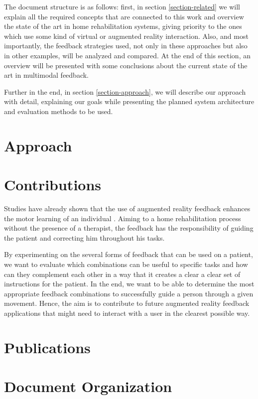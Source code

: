 
The document structure is as follows: first, in section \ref{section-related} we will 
explain all the required concepts that are connected to 
this work and overview the state of the art in home rehabilitation systems, giving priority to 
the ones which use some kind of virtual or augmented reality interaction. Also, and most importantly, the feedback strategies used,
not only in these approaches but also in other examples, will be analyzed and compared. 
At the end of this section, an overview will be presented with some conclusions about the current state of the art in multimodal feedback.

Further in the end, in section \ref{section-approach}, we will describe our approach with detail, explaining our goals 
while presenting the planned system architecture and evaluation methods to be used.


\section{Approach}

\section{Contributions}


Studies have already shown that the use of augmented reality feedback enhances the motor learning of an individual \cite{Sigrist2013}.
Aiming to a home rehabilitation process without the presence of a therapist,
the feedback has the responsibility of guiding the patient and correcting him throughout his tasks.

By experimenting on the several forms of feedback that can be used on a patient, we want to evaluate which 
combinations can be useful to specific tasks and how can they complement each other 
in a way that it creates a clear a clear set of instructions for the patient. 
In the end, we want to be able to determine the most appropriate feedback combinations to successfully guide a person through a given movement.
Hence, the aim is to contribute to future augmented reality feedback applications that might need to interact with a user in the clearest possible way.

 

\section{Publications}


\section{Document Organization}
